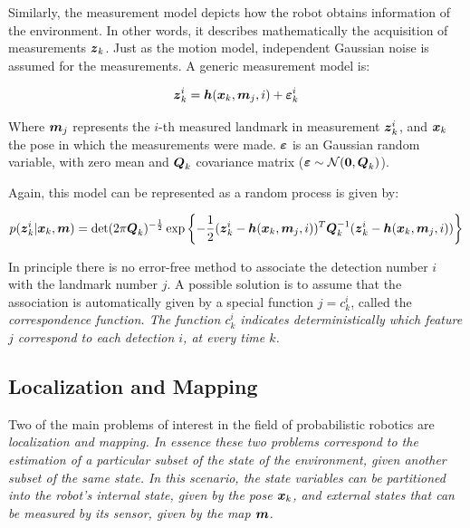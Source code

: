 Similarly, the measurement model depicts how the robot obtains information of the environment. In other words, it describes mathematically the acquisition of measurements $\boldsymbol{z}_k$. Just as the motion model, independent Gaussian noise is assumed for the measurements. A generic measurement model is:

\begin{equation}
\boldsymbol{z}_k^i = \boldsymbol{h}(\boldsymbol{x}_k,\boldsymbol{m}_j,i) + \boldsymbol{\varepsilon}_k^i
\label{eq:measurement-model}
\end{equation} 

\noindent
Where $\boldsymbol{m}_j$ represents the $i$-th measured landmark in measurement $\boldsymbol{z}_k^i$, and $\boldsymbol{x}_k$ the pose in which the measurements were made. $\boldsymbol{\varepsilon}$ is an Gaussian random variable, with zero mean and $\boldsymbol{Q}_k$ covariance matrix ($\boldsymbol{\varepsilon} \sim \mathcal{N}(\boldsymbol{0},\boldsymbol{Q}_k)$).

Again, this model can be represented as a random process is given by:

\begin{equation}
p(\boldsymbol{z}_k^i|\boldsymbol{x}_k,\boldsymbol{m}) = \det(2\pi \boldsymbol{Q}_k)^{-\frac{1}{2}}\exp\left\lbrace -\frac{1}{2}(\boldsymbol{z}_k^i-\boldsymbol{h}(\boldsymbol{x}_k,\boldsymbol{m}_j,i))^T
\boldsymbol{Q}_k^{-1}(\boldsymbol{z}_k^i-\boldsymbol{h}(\boldsymbol{x}_k,\boldsymbol{m}_j,i))\right\rbrace 
\label{eq:measure-pdf}
\end{equation}

In principle there is no error-free method to associate the detection number $i$ with the landmark number $j$. A possible solution is to assume that the association is automatically given by a special function $j=c_k^i$, called the \it{correspondence function}. The function $c_k^i$ indicates deterministically which feature $j$ correspond to each detection $i$, at every time $k$.

\subsection{Localization and Mapping}

Two of the main problems of interest in the field of probabilistic robotics are \it{localization} and \it{mapping}. In essence these two problems correspond to the estimation of a particular subset of the state of the environment, given another subset of the same state. In this scenario, the state variables can be partitioned into the robot's internal state, given by the pose $\boldsymbol{x}_k$, and external states that can be measured by its sensor, given by the map $\boldsymbol{m}$.

